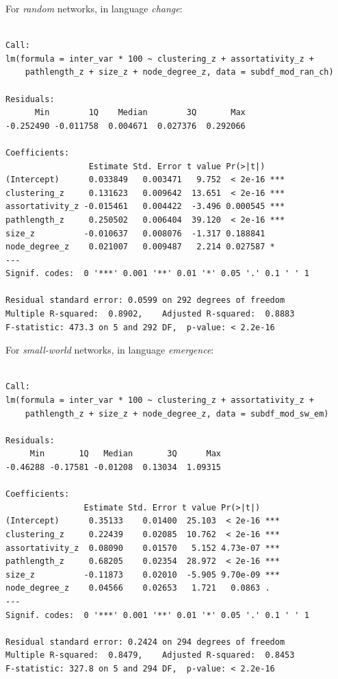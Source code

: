 \documentclass[
]{article}
\begin{document}
For \emph{random} networks, in language \emph{change}:

\begin{verbatim}

Call:
lm(formula = inter_var * 100 ~ clustering_z + assortativity_z + 
    pathlength_z + size_z + node_degree_z, data = subdf_mod_ran_ch)

Residuals:
      Min        1Q    Median        3Q       Max 
-0.252490 -0.011758  0.004671  0.027376  0.292066 

Coefficients:
                 Estimate Std. Error t value Pr(>|t|)    
(Intercept)      0.033849   0.003471   9.752  < 2e-16 ***
clustering_z     0.131623   0.009642  13.651  < 2e-16 ***
assortativity_z -0.015461   0.004422  -3.496 0.000545 ***
pathlength_z     0.250502   0.006404  39.120  < 2e-16 ***
size_z          -0.010637   0.008076  -1.317 0.188841    
node_degree_z    0.021007   0.009487   2.214 0.027587 *  
---
Signif. codes:  0 '***' 0.001 '**' 0.01 '*' 0.05 '.' 0.1 ' ' 1

Residual standard error: 0.0599 on 292 degrees of freedom
Multiple R-squared:  0.8902,    Adjusted R-squared:  0.8883 
F-statistic: 473.3 on 5 and 292 DF,  p-value: < 2.2e-16
\end{verbatim}

For \emph{small-world} networks, in language \emph{emergence}:

\begin{verbatim}

Call:
lm(formula = inter_var * 100 ~ clustering_z + assortativity_z + 
    pathlength_z + size_z + node_degree_z, data = subdf_mod_sw_em)

Residuals:
     Min       1Q   Median       3Q      Max 
-0.46288 -0.17581 -0.01208  0.13034  1.09315 

Coefficients:
                Estimate Std. Error t value Pr(>|t|)    
(Intercept)      0.35133    0.01400  25.103  < 2e-16 ***
clustering_z     0.22439    0.02085  10.762  < 2e-16 ***
assortativity_z  0.08090    0.01570   5.152 4.73e-07 ***
pathlength_z     0.68205    0.02354  28.972  < 2e-16 ***
size_z          -0.11873    0.02010  -5.905 9.70e-09 ***
node_degree_z    0.04566    0.02653   1.721   0.0863 .  
---
Signif. codes:  0 '***' 0.001 '**' 0.01 '*' 0.05 '.' 0.1 ' ' 1

Residual standard error: 0.2424 on 294 degrees of freedom
Multiple R-squared:  0.8479,    Adjusted R-squared:  0.8453 
F-statistic: 327.8 on 5 and 294 DF,  p-value: < 2.2e-16
\end{verbatim}
\end{document}
